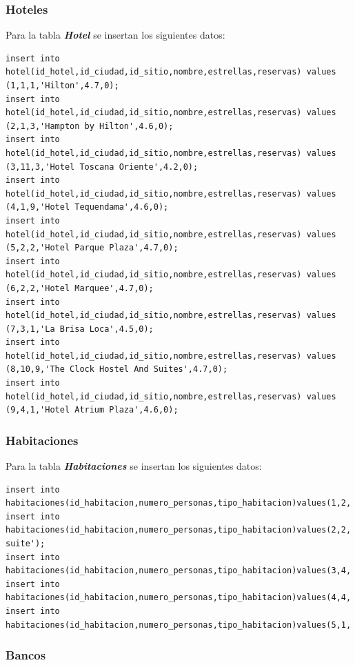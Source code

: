 \documentclass{article}
\begin{document}
\subsubsection{Hoteles}

Para la tabla \textit{\textbf{Hotel}} se insertan los siguientes datos:

\begin{lstlisting}
insert into hotel(id_hotel,id_ciudad,id_sitio,nombre,estrellas,reservas) values (1,1,1,'Hilton',4.7,0);
insert into hotel(id_hotel,id_ciudad,id_sitio,nombre,estrellas,reservas) values (2,1,3,'Hampton by Hilton',4.6,0);
insert into hotel(id_hotel,id_ciudad,id_sitio,nombre,estrellas,reservas) values (3,11,3,'Hotel Toscana Oriente',4.2,0);
insert into hotel(id_hotel,id_ciudad,id_sitio,nombre,estrellas,reservas) values (4,1,9,'Hotel Tequendama',4.6,0);
insert into hotel(id_hotel,id_ciudad,id_sitio,nombre,estrellas,reservas) values (5,2,2,'Hotel Parque Plaza',4.7,0);
insert into hotel(id_hotel,id_ciudad,id_sitio,nombre,estrellas,reservas) values (6,2,2,'Hotel Marquee',4.7,0);
insert into hotel(id_hotel,id_ciudad,id_sitio,nombre,estrellas,reservas) values (7,3,1,'La Brisa Loca',4.5,0);
insert into hotel(id_hotel,id_ciudad,id_sitio,nombre,estrellas,reservas) values (8,10,9,'The Clock Hostel And Suites',4.7,0);
insert into hotel(id_hotel,id_ciudad,id_sitio,nombre,estrellas,reservas) values (9,4,1,'Hotel Atrium Plaza',4.6,0);
\end{lstlisting}

\subsubsection{Habitaciones}

Para la tabla \textit{\textbf{Habitaciones}} se insertan los siguientes datos:

\begin{lstlisting}
insert into habitaciones(id_habitacion,numero_personas,tipo_habitacion)values(1,2,'Suite');
insert into habitaciones(id_habitacion,numero_personas,tipo_habitacion)values(2,2,'Gran suite');
insert into habitaciones(id_habitacion,numero_personas,tipo_habitacion)values(3,4,'Dobles');
insert into habitaciones(id_habitacion,numero_personas,tipo_habitacion)values(4,4,'Cuadruples');
insert into habitaciones(id_habitacion,numero_personas,tipo_habitacion)values(5,1,'Individual');
\end{lstlisting}

\subsubsection{Bancos}
\end{document}

